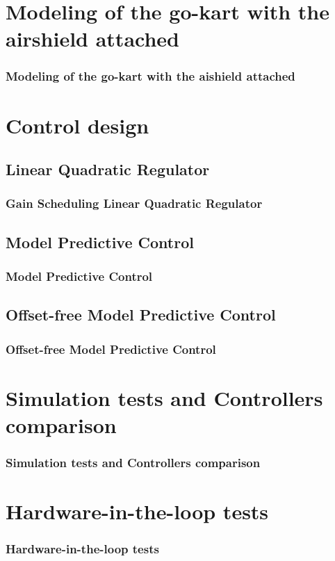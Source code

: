 \documentclass[11pt, aspectratio=169]{beamer}
\begin{document}
\section{Modeling of the go-kart with the airshield attached}
\begin{frame}[t]
\frametitle{Modeling of the go-kart with the aishield attached}
\end{frame}

\section{Control design}
\subsection{Linear Quadratic Regulator}
\begin{frame}[t]
\frametitle{Gain Scheduling Linear Quadratic Regulator}
\end{frame}


\subsection{Model Predictive Control}
\begin{frame}
\frametitle{Model Predictive Control}
\end{frame}


\subsection{Offset-free Model Predictive Control}
\begin{frame}
\frametitle{Offset-free Model Predictive Control}
\end{frame}

\section{Simulation tests and Controllers comparison}
\begin{frame}
\frametitle{Simulation tests and Controllers comparison}
\end{frame}

\section{Hardware-in-the-loop tests}
\begin{frame}
\frametitle{Hardware-in-the-loop tests}
\end{frame}
\end{document}
